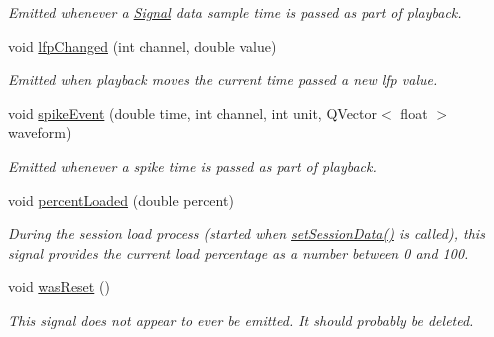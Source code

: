 \begin{DoxyCompactItemize}
\begin{DoxyCompactList}\small\item\em Emitted whenever a \hyperlink{class_picto_1_1_signal}{Signal} data sample time is passed as part of playback. \end{DoxyCompactList}\item 
void \hyperlink{class_picto_1_1_session_state_a5ab201c9c6bbe8e09774987465bcc2df}{lfp\-Changed} (int channel, double value)
\begin{DoxyCompactList}\small\item\em Emitted when playback moves the current time passed a new lfp value. \end{DoxyCompactList}\item 
void \hyperlink{class_picto_1_1_session_state_a41d2edbdbc1239351e37402c8c5d41d0}{spike\-Event} (double time, int channel, int unit, Q\-Vector$<$ float $>$ waveform)
\begin{DoxyCompactList}\small\item\em Emitted whenever a spike time is passed as part of playback. \end{DoxyCompactList}\item 
void \hyperlink{class_picto_1_1_session_state_a46343f31e2c22668f4f781ce6f2f6679}{percent\-Loaded} (double percent)
\begin{DoxyCompactList}\small\item\em During the session load process (started when \hyperlink{class_picto_1_1_session_state_a54ef9957c7c3f166de6bcc76f61b65f9}{set\-Session\-Data()} is called), this signal provides the current load percentage as a number between 0 and 100. \end{DoxyCompactList}\item 
\hypertarget{class_picto_1_1_session_state_adc9a3ece6db23a6ffb2de22ab10ab7d4}{void \hyperlink{class_picto_1_1_session_state_adc9a3ece6db23a6ffb2de22ab10ab7d4}{was\-Reset} ()}\label{class_picto_1_1_session_state_adc9a3ece6db23a6ffb2de22ab10ab7d4}

\begin{DoxyCompactList}\small\item\em This signal does not appear to ever be emitted. It should probably be deleted. \end{DoxyCompactList}\end{DoxyCompactItemize}
